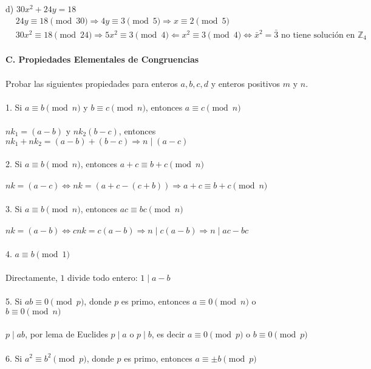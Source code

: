 \documentclass{article}
\begin{document}
d) $30x^{2}+24y=18$
\begin{equation*}
\begin{aligned}
    &24y \equiv 18 \pmod{30} \Longrightarrow 4y \equiv 3 \pmod{5} \Longrightarrow x \equiv 2 \pmod{5} \\
    &30x^{2} \equiv 18 \pmod{24} \Longrightarrow 5x^{2} \equiv 3 \pmod{4} \Longleftarrow x^{2} \equiv 3 \pmod{4} \Longleftrightarrow \bar{x}^{2} = \bar{3} \text{ no tiene solución en } \mathbb{Z}_{4}
\end{aligned}
\end{equation*}
\\
\textbf{C. Propiedades Elementales de Congruencias}
\\
\\
Probar las siguientes propiedades para enteros $a,b,c,d$ y enteros positivos $m$ y $n$.
\\
\\
1. Si $a \equiv b \pmod{n}$ y $b \equiv c \pmod{n}$, entonces $a \equiv c \pmod{n}$
\\
\\
$nk_{1}=(a-b)$ y $nk_{2}(b-c)$, entonces $nk_{1}+nk_{2}=(a-b)+(b-c) \Longrightarrow  n \mid (a-c)$
\\
\\
2. Si $a \equiv b \pmod{n}$, entonces $a+c \equiv b+c \pmod{n}$
\\
\\
$nk=(a-c) \Longleftrightarrow nk=(a+c-(c+b)) \Longrightarrow a+c \equiv b+c \pmod{n}$
\\
\\
3. Si $a \equiv b \pmod{n}$, entonces $ac \equiv bc \pmod{n}$
\\
\\
$nk=(a-b) \Longleftrightarrow cnk=c(a-b) \Longrightarrow n \mid c(a-b) \Longrightarrow n \mid ac-bc$
\\
\\
4. $a \equiv b \pmod{1}$
\\
\\
Directamente, $1$ divide todo entero: $1 \mid a-b$
\\
\\
5. Si $ab \equiv 0 \pmod{p}$, donde $p$ es primo, entonces $a \equiv 0 \pmod{n}$ o $b \equiv 0 \pmod{n}$
\\
\\
$p \mid ab$, por lema de Euclides $p \mid a$ o $p \mid b$, es decir $a \equiv 0 \pmod{p}$ o $b \equiv 0 \pmod{p}$
\\
\\
6. Si $a^{2} \equiv b^{2} \pmod{p}$, donde $p$ es primo, entonces $a \equiv \pm b \pmod{p}$
\end{document}
